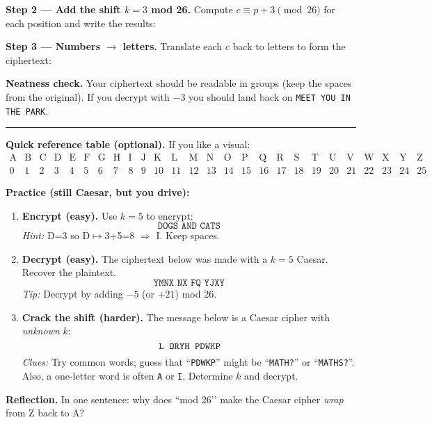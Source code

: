 \documentclass[12pt]{article}
\newcommand{\workbox}[1]{\fbox{\parbox{\dimexpr\textwidth-2\fboxsep-2\fboxrule\relax}{\vspace{#1}}}}
\begin{document}
\textbf{Step 2 — Add the shift $k=3$ mod 26.} Compute $c\equiv p+3\pmod{26}$ for each position and write the results:
\smallskip

\workbox{1.7cm}

\textbf{Step 3 — Numbers $\rightarrow$ letters.} Translate each $c$ back to letters to form the ciphertext:
\smallskip

\workbox{1.4cm}

\textbf{Neatness check.} Your ciphertext should be readable in groups (keep the spaces from the original). If you decrypt with $-3$ you should land back on \texttt{MEET YOU IN THE PARK}.

\vspace{0.6em}
\hrule
\vspace{0.6em}

\textbf{Quick reference table (optional).} If you like a visual:
\[
\begin{array}{cccccccccccccccccccccccccc}
\text{A}&\text{B}&\text{C}&\text{D}&\text{E}&\text{F}&\text{G}&\text{H}&\text{I}&\text{J}&\text{K}&\text{L}&\text{M}&\text{N}&\text{O}&\text{P}&\text{Q}&\text{R}&\text{S}&\text{T}&\text{U}&\text{V}&\text{W}&\text{X}&\text{Y}&\text{Z}\\
0&1&2&3&4&5&6&7&8&9&10&11&12&13&14&15&16&17&18&19&20&21&22&23&24&25
\end{array}
\]

\bigskip

{\large \textbf{Practice (still Caesar, but you drive):}}
\begin{enumerate}[label=\textbf{P\arabic*.}, leftmargin=1.4em, itemsep=0.9em]

\item \textbf{Encrypt (easy).} Use $k=5$ to encrypt:
\[
\texttt{DOGS AND CATS}
\]
\emph{Hint:} D=3 so D$\mapsto$3+5=8 $\Rightarrow$ I. Keep spaces. \\
\workbox{2.0cm}

\item \textbf{Decrypt (easy).} The ciphertext below was made with a $k=5$ Caesar. Recover the plaintext.
\[
\texttt{YMNX NX FQ YJXY}
\]
\emph{Tip:} Decrypt by adding $-5$ (or $+21$) mod 26. \\
\workbox{2.0cm}

\item \textbf{Crack the shift (harder).} The message below is a Caesar cipher with \emph{unknown} $k$:
\[
\texttt{L ORYH PDWKP\!}
\]
\emph{Clues:} Try common words; guess that ``\texttt{PDWKP}'' might be ``\texttt{MATH?}'' or ``\texttt{MATHS?}''. Also, a one-letter word is often \texttt{A} or \texttt{I}. Determine $k$ and decrypt. \\
\workbox{2.2cm}

\end{enumerate}

\bigskip

\textbf{Reflection.} In one sentence: why does ``mod 26’’ make the Caesar cipher \emph{wrap} from Z back to A? \\
\workbox{1.2cm}
\end{document}
